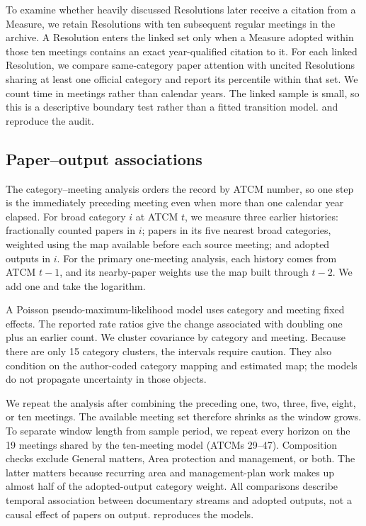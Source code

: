 \documentclass{fun_article}
\begin{document}
To examine whether heavily discussed Resolutions later receive a citation from a Measure, we retain Resolutions with ten subsequent regular meetings in the archive. A Resolution enters the linked set only when a Measure adopted within those ten meetings contains an exact year-qualified citation to it. For each linked Resolution, we compare same-category paper attention with uncited Resolutions sharing at least one official category and report its percentile within that set. We count time in meetings rather than calendar years. The linked sample is small, so this is a descriptive boundary test rather than a fitted transition model. \texttt{} and \texttt{} reproduce the audit.

\subsection{Paper--output associations}\label{sec:attention-output-models}
The category--meeting analysis orders the record by ATCM number, so one step is the immediately preceding meeting even when more than one calendar year elapsed. For broad category $i$ at ATCM $t$, we measure three earlier histories: fractionally counted papers in $i$; papers in its five nearest broad categories, weighted using the map available before each source meeting; and adopted outputs in $i$. For the primary one-meeting analysis, each history comes from ATCM $t-1$, and its nearby-paper weights use the map built through $t-2$. We add one and take the logarithm.

A Poisson pseudo-maximum-likelihood model uses category and meeting fixed effects. The reported rate ratios give the change associated with doubling one plus an earlier count. We cluster covariance by category and meeting. Because there are only 15 category clusters, the intervals require caution. They also condition on the author-coded category mapping and estimated map; the models do not propagate uncertainty in those objects.

We repeat the analysis after combining the preceding one, two, three, five, eight, or ten meetings. The available meeting set therefore shrinks as the window grows. To separate window length from sample period, we repeat every horizon on the 19 meetings shared by the ten-meeting model (ATCMs 29--47). Composition checks exclude General matters, Area protection and management, or both. The latter matters because recurring area and management-plan work makes up almost half of the adopted-output category weight. All comparisons describe temporal association between documentary streams and adopted outputs, not a causal effect of papers on output. \texttt{} reproduces the models.
\end{document}
